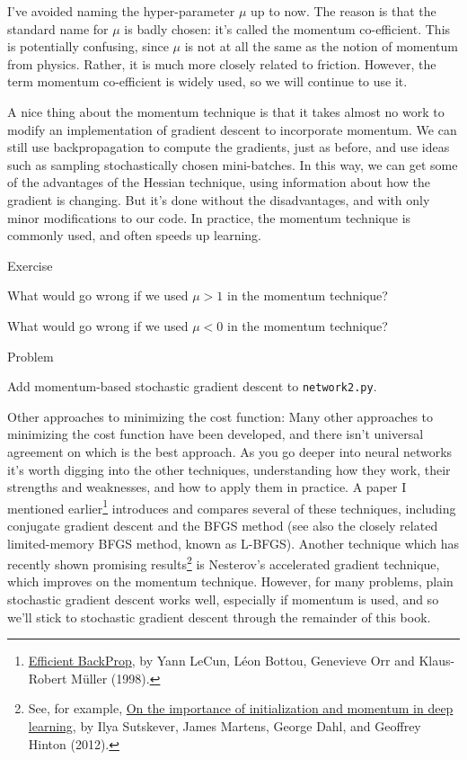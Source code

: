 \documentclass[a4paper,twoside,10pt]{book}
\begin{document}
I've avoided naming the hyper-parameter $\mu$ up to now. The reason is that the standard name for $\mu$ is badly chosen: it's called the momentum co-efficient. This is potentially confusing, since $\mu$ is not at all the same as the notion of momentum from physics. Rather, it is much more closely related to friction. However, the term momentum co-efficient is widely used, so we will continue to use it.

A nice thing about the momentum technique is that it takes almost no work to modify an implementation of gradient descent to incorporate momentum. We can still use backpropagation to compute the gradients, just as before, and use ideas such as sampling stochastically chosen mini-batches. In this way, we can get some of the advantages of the Hessian technique, using information about how the gradient is changing. But it's done without the disadvantages, and with only minor modifications to our code. In practice, the momentum technique is commonly used, and often speeds up learning.

\begin{exercize}{Exercise}
\item What would go wrong if we used $\mu>1$ in the momentum technique?
\item What would go wrong if we used $\mu<0$ in the momentum technique?
\end{exercize}

\begin{exercize}{Problem}
\item Add momentum-based stochastic gradient descent to \texttt{network2.py}.
\end{exercize}
Other approaches to minimizing the cost function: Many other approaches to minimizing the cost function have been developed, and there isn't universal agreement on which is the best approach. As you go deeper into neural networks it's worth digging into the other techniques, understanding how they work, their strengths and weaknesses, and how to apply them in practice. A paper I mentioned earlier\footnote{\href{http://yann.lecun.com/exdb/publis/pdf/lecun-98b.pdf}{Efficient BackProp}, by Yann LeCun, L\'eon Bottou, Genevieve Orr and Klaus-Robert M\"uller (1998).} introduces and compares several of these techniques, including conjugate gradient descent and the BFGS method (see also the closely related limited-memory BFGS method, known as L-BFGS). Another technique which has recently shown promising results\footnote{See, for example, \href{http://www.cs.toronto.edu/~hinton/absps/momentum.pdf}{On the importance of initialization and momentum in deep learning}, by Ilya Sutskever, James Martens, George Dahl, and Geoffrey Hinton (2012).} is Nesterov's accelerated gradient technique, which improves on the momentum technique. However, for many problems, plain stochastic gradient descent works well, especially if momentum is used, and so we'll stick to stochastic gradient descent through the remainder of this book.
\end{document}
